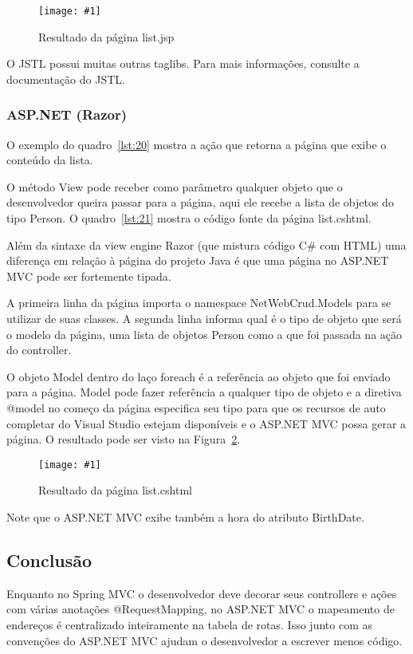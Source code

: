 \documentclass[a4paper,12pt]{article}
\newcommand{\figura}[3] {
	\begin{figure}[ht]
		\centering
		\texttt{[image: \#1]}
		\caption{#2}
		\label{#3}
	\end{figure}
	\FloatBarrier
}
\newcommand{\sharpcode}[3] {
	
}
\begin{document}
\figura{34.png}{Resultado da página list.jsp}{fig:34}

O JSTL possui muitas outras taglibs. Para mais informações, consulte a documentação do JSTL.

\subsubsection{ASP.NET (Razor)}

O exemplo do quadro~\ref{lst:20} mostra a ação que retorna a página que exibe o conteúdo da lista.

\sharpcode{code/20.txt}{Ação que retorna a página list.cshtml}{lst:20}

O método View pode receber como parâmetro qualquer objeto que o desenvolvedor queira passar para a página, aqui ele recebe a lista de objetos do tipo Person. O quadro~\ref{lst:21} mostra o código fonte da página list.cshtml.

\sharpcode{code/21.txt}{Código fonte da página list.cshtml}{lst:21}

Além da sintaxe da view engine Razor (que mistura código C\# com HTML) uma diferença em relação à página do projeto Java é que uma página no ASP.NET MVC pode ser fortemente tipada.

A primeira linha da página importa o namespace NetWebCrud.Models para se utilizar de suas classes. A segunda linha informa qual é o tipo de objeto que será o modelo da página, uma lista de objetos Person como a que foi passada na ação do controller.

O objeto Model dentro do laço foreach é a referência ao objeto que foi enviado para a página. Model pode fazer referência a qualquer tipo de objeto e a diretiva @model no começo da página especifica seu tipo para que os recursos de auto completar do Visual Studio estejam disponíveis e o ASP.NET MVC possa gerar a página. O resultado pode ser visto na Figura~\ref{fig:35}.

\figura{35.png}{Resultado da página list.cshtml}{fig:35}

Note que o ASP.NET MVC exibe também a hora do atributo BirthDate.

\subsection{Conclusão}

Enquanto no Spring MVC o desenvolvedor deve decorar seus controllers e ações com várias anotações @RequestMapping, no ASP.NET MVC o mapeamento de endereços é centralizado inteiramente na tabela de rotas. Isso junto com as convenções do ASP.NET MVC ajudam o desenvolvedor a escrever menos código.
\end{document}
